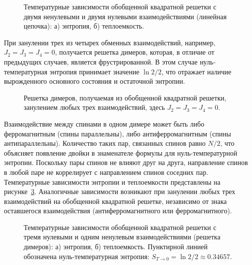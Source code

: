 \begin{figure}[h]
	\begin{minipage}[h]{0.5\linewidth}
	\end{minipage}
	\hfill
	\begin{minipage}[h]{0.5\linewidth}
	\end{minipage}
	\caption{Температурные зависимости обобщенной квадратной решетки с двумя ненулевыми и двумя нулевыми взаимодействиями (линейная цепочка): а) энтропия, б) теплоемкость.}
	\label{Linear}
\end{figure}

При занулении трех из четырех обменных взаимодействий, например, $J_2 = J_3 = J_4 = 0$, получается решетка димеров, которая, в отличие от предыдущих случаев, является фрустрированной. В этом случае нуль-температурная энтропия принимает значение $\ln 2/2$, что отражает наличие вырожденного основного состояния и остаточной энтропии.

\begin{figure}[h]
	\caption{Решетка димеров, получаемая из обобщенной квадратной решетки, занулением любых трех взаимодействий, здесь $J_2 = J_3 = J_4 = 0$.}
	\label{dimerLattice}
\end{figure}

Взаимодействие между спинами в одном димере может быть либо ферромагнитным (спины параллельны), либо антиферромагнитным (спины антипараллельны). Количество таких пар, связанных спинов равно $N/2$, что объясняет появление двойки в знаменателе формулы для нуль-температурной энтропии. Поскольку пары спинов не влияют друг на друга, направление спинов в любой паре не коррелирует с направлением спинов соседних пар. Температурные зависимости энтропии и теплоемкости представлены на рисунке~\ref{Dimers}. Аналогичные зависимости возникают при занулении любых трех взаимодействий на обобщенной квадратной решетке, независимо от знака оставшегося взаимодействия (антиферромагнитного или ферромагнитного).

\begin{figure}[h]
	\begin{minipage}[h]{0.5\linewidth}
	\end{minipage}
	\hfill
	\begin{minipage}[h]{0.5\linewidth}
	\end{minipage}
	\caption{Температурные зависимости обобщенной квадратной решетки с тремя нулевыми и одним ненулевым взаимодействиями (решетка димеров): а) энтропия, б) теплоемкость. Пунктирной линией обозначена нуль-температурная энтропия: $S_{T\rightarrow 0} = \ln 2/2\approx 0.34657$.}
	\label{Dimers}
\end{figure}

